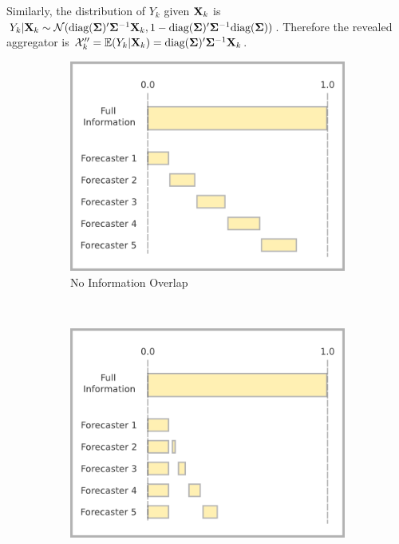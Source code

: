 \documentclass[11pt]{article}
\newcommand{\E}{\mathbb{E}}
\theoremstyle{definition}
\theoremstyle{definition}
\def\bSigma{{\bf \Sigma}}
\def\X{{\bf X}}
\def\E{{\mathbb E}}
\def\diag{\text{diag}}
\def\diag{\text{diag}}
\begin{document}
Similarly, the distribution of $Y_k$ given $\X_k$ is $Y_k | \X_k \sim \mathcal{N}(\diag(\bSigma)'\bSigma^{-1}\X_k, 1- \diag(\bSigma)'\bSigma^{-1}\diag(\bSigma))$. Therefore the revealed aggregator is $\mathcal{X}_k''  = \E(Y_k | \X_k) = \diag(\bSigma)'\bSigma^{-1}\X_k$. 




\begin{figure}[t!]
        \centering
        \begin{subfigure}[b]{0.49\textwidth}
                \includegraphics[width=\textwidth]{IndepDiagram}
                \caption{No Information Overlap}
                \label{DiagramsA}
        \end{subfigure}%
        ~ %
        \begin{subfigure}[b]{0.49\textwidth}
                \includegraphics[width=\textwidth]{DepDiagram}

\end{subfigure}
\end{figure}
\end{document}
